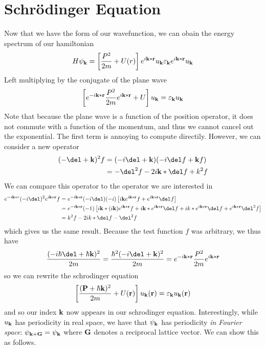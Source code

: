 \section{Schr\"odinger Equation}
Now that we have the form of our wavefunction, we can obain the energy spectrum of our hamiltonian
\[H\psi_{\mathbf{k}} = \left[\frac{P^2}{2m}+U(r)\right]e^{i\mathbf{k}*\mathbf{r}}u_{\mathbf{k}} \varepsilon_{\mathbf{k}} e^{i\mathbf{k}*\mathbf{r}} u_{\mathbf{k}}\]
Left multiplying by the conjugate of the plane wave
\[\left[e^{-i\mathbf{k}*\mathbf{r}}\frac{P^2}{2m} e^{i\mathbf{k}*\mathbf{r}}+U\right]u_{\mathbf{k}} = \varepsilon_{\mathbf{k}}u_{\mathbf{k}}\]
Note that because the plane wave is a function of the position operator, it does not commute with a function of the momentum, and thus we cannot cancel out the exponential. The first term is annoying to compute directily. However, we can consider a new operator
\begin{align*}
	(-\del + \vb k)^2f&= (-i\del + \vb k)(-i\del f + \vb k f)\\
			  &= - \del^2 f - 2i \vb k*\del f+ k^2 f
\end{align*}
We can compare this operator to the operator we are interested in
\begin{align*}
	e^{-i\vb k*r}(-i\del)^2e^{i\vb k*\vb r}f&=e^{-i\vb k*\vb r}(-i\del)(-i)\left[i\vb k e^{i\vb k*\vb r}f + e^{i\vb k*\vb r}\del f\right]\\
						&=e^{-i\vb k*\vb r}(-1)\left[i\vb k*(i\vb k)e^{i\vb k * \vb r}f + i\vb k* e^{i\vb k*\vb r}\del f + ik *e^{i\vb k * \vb r} \del f + e^{i\vb k*\vb r}\del^2 f\right]\\
						&=k^2 f -2ik*\del f - \del^2 f
\end{align*}
which gives us the same result. Because the test function \(f\) was arbitrary, we thus have
\[\frac{(-i\hbar\del + \hbar\vb k)^2}{2m}=\frac{\hbar^2(-i\del +\vb k)^2}{2m} = e^{-i\vb k*\vb r}\frac{P^2}{2m}e^{i\vb k * \vb r}\]
so we can rewrite the schrodinger equation 
\begin{equation}
	\left[\frac{(\mathbf{P}+\hbar \mathbf{k})^2}{2m}+U(\mathbf{r})\right] u_{\mathbf{k}}(\mathbf{r}) = \varepsilon_{\mathbf{k}}u_{\mathbf{k}}(\mathbf{r})
\end{equation}
and so our index \(\mathbf{k}\) now appears in our schrodinger equation. Interestingly, while \(u_{\mathbf{k}}\) has periodicity in real space, we have that \(\psi_{\mathbf{k}}\) has periodicity \emph{in Fourier space}:
\(\psi_{\mathbf{k}+\mathbf{G}} = \psi_{\mathbf{k}}\)
where \(\mathbf{G}\) denotes a reciprocal lattice vector. We can show this as follows.

